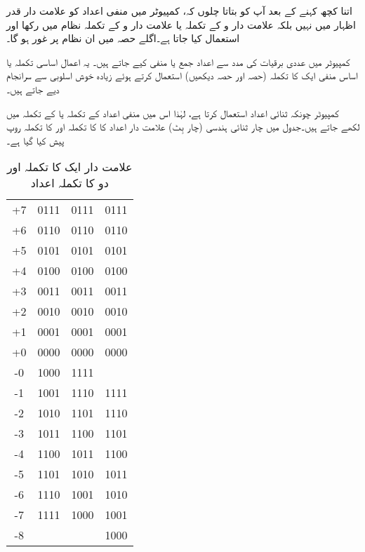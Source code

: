 اتنا کچھ کہنے کے بعد آپ کو بتاتا چلوں کہ،  کمپیوٹر میں منفی  اعداد کو  علامت دار قدر اظہار  میں نہیں بلکہ علامت دار و   کے  تکملہ   یا علامت دار و   کے تکملہ  نظام  میں رکھا اور استعمال کیا جاتا ہے۔اگلے حصہ میں ان  نظام  پر غور ہو گا۔

کمپیوٹر میں عددی  برقیات  کی  مدد سے اعداد جمع یا منفی کیے جاتے ہیں۔  یہ اعمال اساسی تکملہ یا اساس منفی ایک  کا تکملہ (حصہ  اور  حصہ  دیکھیں)  استعمال کرتے ہوئے زیادہ خوش اسلوبی سے سرانجام دیے جاتے ہیں۔

 کمپیوٹر  چونکہ  ثنائی اعداد استعمال   کرتا ہے، لہٰذا اس میں   منفی اعداد      کے تکملہ  یا  کے تکملہ     میں لکھے جاتے ہیں۔جدول   میں    چار  ثنائی ہندسی (چار بِٹ)   علامت دار  اعداد کا      کا تکملہ  اور   کا تکملہ   روپ پیش کیا گیا ہے۔
\begin{table}
\caption{علامت دار  ایک کا تکملہ  اور دو کا  تکملہ  اعداد}
\label{جدول_حساب_علامت_دار_تکملہ_ایک_دو}
\centering
\begin{tabular}{CCCC}
\toprule
{} &  &  & \\
\midrule
+7&0111&0111&0111\\
+6&0110&0110&0110\\
+5&0101&0101&0101\\
+4&0100&0100&0100\\[0.5em]
+3&0011&0011&0011\\
+2&0010&0010&0010\\
+1&0001&0001&0001\\
+0&0000&0000&0000\\[0.5em]
-0&1000&1111&\\
-1&1001&1110&1111\\
-2&1010&1101&1110\\
-3&1011&1100&1101\\[0.5em]
-4&1100&1011&1100\\
-5&1101&1010&1011\\
-6&1110&1001&1010\\
-7&1111&1000&1001\\
-8&&&1000\\
\bottomrule
\end{tabular}
\end{table}

